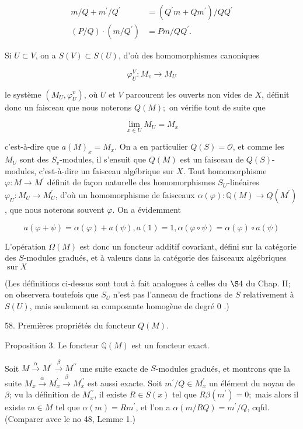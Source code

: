 $$
\begin{aligned}
    m / Q+m^{\prime} / Q^{\prime} &=\left(Q^{\prime} m+Q m^{\prime}\right) / Q Q^{\prime} \\
    (P / Q) \cdot\left(m / Q^{\prime}\right) &=P m / Q Q^{\prime} .
\end{aligned}
$$

Si $U \subset V$, on a $S(V) \subset S(U)$, d'où des homomorphismes canoniques

$$
\varphi_{U}^{V}: M_{v} \rightarrow M_{U}
$$

le système $\left(M_{U}, \varphi_{U}^{v}\right)$, où $U$ et $V$ parcourent les ouverts non vides de $X$, définit donc un faisceau que nous noterons $Q(M) ;$ on vérifie tout de suite que

$$
\lim _{x \in U} M_{U}=M_{x}
$$

c'est-à-dire que $a(M)_{x}=M_{x} .$ On a en particulier $Q(S)=\mathcal{O}$, et comme les $M_{U}$ sont des $S_{v}$-modules, il s'ensuit que $Q(M)$ est un faisceau de $Q(S)$-modules, c'est-à-dire un faisceau algébrique sur $X$. Tout homomorphisme $\varphi: M \rightarrow M^{\prime}$ définit de façon naturelle des homomorphismes $S_{U}$-linéaires $\varphi_{U}: M_{U} \rightarrow M_{U}^{\prime}$, d'où un homomorphisme de faisceaux $\alpha(\varphi): \mathbb{Q}(M) \rightarrow Q\left(M^{\prime}\right)$, que nous noterons souvent $\varphi$. On a évidemment

$$
a(\varphi+\psi)=\alpha(\varphi)+a(\psi), a(1)=1, \alpha(\varphi \circ \psi)=\alpha(\varphi) \circ a(\psi)
$$

L'opération $\Omega(M)$ est donc un foncteur additif covariant, défini sur la catégorie des $S$-modules gradués, et à valeurs dans la catégorie des faisceaux algébriques $\operatorname{sur} X$

(Les définitions ci-dessus sont tout à fait analogues à celles du $\S 4$ du Chap. II; on observera toutefois que $S_{U}$ n'est pas l'anneau de fractions de $S$ relativement à $S(U)$, mais seulement sa composante homogène de degré 0 .)

58. Premières propriétés du foncteur $Q(M)$.

Proposition 3. Le foncteur $\mathbb{Q}(M)$ est un foncteur exact.

Soit $M \stackrel{\alpha}{\rightarrow} M^{\prime} \stackrel{\beta}{\rightarrow} M^{\prime \prime}$ une suite exacte de $S$-modules gradués, et montrons que la suite $M_{x} \stackrel{\alpha}{\rightarrow} M_{x}^{\prime} \stackrel{\beta}{\rightarrow} M_{x}^{\prime \prime}$ est aussi exacte. Soit $m^{\prime} / Q \in M_{x}^{\prime}$ un élément du noyau de $\beta$; vu la définition de $M_{x}^{\prime \prime}$, il existe $R \in S(x)$ tel que $R \beta\left(m^{\prime}\right)=0 ;$ mais alors il existe $m \in M$ tel que $\alpha(m)=R m^{\prime}$, et l'on a $\alpha(m / R Q)=m^{\prime} / Q$, cqfd. (Comparer avec le no 48, Lemme 1.)

